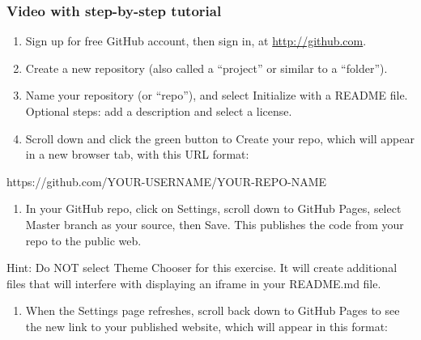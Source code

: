 \documentclass[
  english,
]{book}
\newenvironment{Shaded}{\begin{snugshade}}{\end{snugshade}}
\newcommand{\NormalTok}[1]{#1}
\providecommand{\tightlist}{%
  \setlength{\itemsep}{0pt}\setlength{\parskip}{0pt}}
\begin{document}
\hypertarget{video-with-step-by-step-tutorial-5}{%
\subsubsection*{Video with step-by-step tutorial}\label{video-with-step-by-step-tutorial-5}}

\begin{enumerate}
\def\labelenumi{\arabic{enumi})}
\item
  Sign up for free GitHub account, then sign in, at \url{http://github.com}.
\item
  Create a new repository (also called a ``project'' or similar to a ``folder'').
\item
  Name your repository (or ``repo''), and select Initialize with a README file. Optional steps: add a description and select a license.
\item
  Scroll down and click the green button to Create your repo, which will appear in a new browser tab, with this URL format:
\end{enumerate}

\begin{Shaded}
\begin{Highlighting}[]
\NormalTok{https://github.com/YOUR{-}USERNAME/YOUR{-}REPO{-}NAME}
\end{Highlighting}
\end{Shaded}

\begin{enumerate}
\def\labelenumi{\arabic{enumi})}
\setcounter{enumi}{4}
\tightlist
\item
  In your GitHub repo, click on Settings, scroll down to GitHub Pages, select Master branch as your source, then Save. This publishes the code from your repo to the public web.
\end{enumerate}

Hint: Do NOT select Theme Chooser for this exercise. It will create additional files that will interfere with displaying an iframe in your README.md file.

\begin{enumerate}
\def\labelenumi{\arabic{enumi})}
\setcounter{enumi}{5}
\tightlist
\item
  When the Settings page refreshes, scroll back down to GitHub Pages to see the new link to your published website, which will appear in this format:
\end{enumerate}
\end{document}
